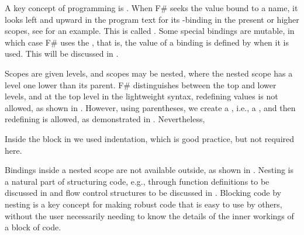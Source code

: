\documentclass[fsharpnotes.tex]{subfiles}
\begin{document}
A key concept of programming is . When F\# seeks the value bound to a name, it looks left and upward in the program text for its -binding in the present or higher scopes, see  for an example. This is called .
%
%
Some special bindings are mutable, in which case F\# uses the , that is, the value of a binding is defined by when it is used. This will be discussed in .

Scopes are given levels, and scopes may be nested, where the nested scope has a level one lower than its parent. F\# distinguishes between the top and lower levels, and at the top level in the lightweight syntax, redefining values is not allowed, as shown in .
%
%
However, using parentheses, we create a , i.e., a , and then redefining is allowed, as demonstrated in .
%
%
Nevertheless, 

Inside the block in  we used indentation, which is good practice, but not required here.

Bindings inside a nested scope are not available outside, as shown in .
%
%
Nesting is a natural part of structuring code, e.g., through function definitions to be discussed in  and flow control structures to be discussed in . Blocking code by nesting is a key concept for making robust code that is easy to use by others, without the user necessarily needing to know the details of the inner workings of a block of code.
\end{document}
